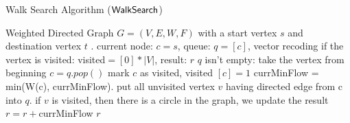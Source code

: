 \documentclass[a4paper,11pt]{article}
\begin{document}
\begin{algorithm}
\caption{
{Walk Search Algorithm ($\mathsf{WalkSearch}$)}
\label{alg:adpt_walk}
}
\begin{algorithmic}
\REQUIRE Weighted Directed Graph $G = (V, E, W, F)$ with a start vertex $s$ and destination vertex $t$ .
\STATE {} 
current node: $c = s$, 
queue: $q = [c]$, 
vector recoding if the vertex is visited: visited$ = [0]*|V|$,
result: $r$
\STATE {} $q$ isn't empty:
\STATE \qquad \qquad take the vertex from beginning $c= q.pop()$
\STATE \qquad \qquad mark $c$ as visited, visited $[c] = 1$
\STATE \qquad \qquad currMinFlow = min(W(c), currMinFlow).
\STATE \qquad \qquad put all unvisited vertex $v$ having directed edge from c into $q$. 
\STATE \qquad \qquad if $v$ is visited, then there is a circle in the graph, we update the result $r = r + $currMinFlow
\RETURN $r$
\end{algorithmic}
\end{algorithm}

%
%
\end{document}
